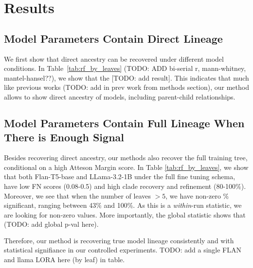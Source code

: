 \documentclass{article}
\theoremstyle{definition}
\theoremstyle{plain}
\begin{document}
\section{Results}
\label{sec:results}


\subsection{Model Parameters Contain Direct Lineage}

We first show that direct ancestry can be recovered under different model conditions. In Table~\ref{tab:rf_by_leaves} (TODO: ADD bi-serial r, mann-whitney, mantel-hansel??), we show that the [TODO: add result].  This indicates that much like previous works (TODO: add in prev work from methods section), our method allows to show direct ancestry of models, including parent-child relationships.

\subsection{Model Parameters Contain Full Lineage When There is Enough Signal}
\label{sec:results:weighttree}
Besides recovering direct ancestry, our methods also recover the full training tree, conditional on a high Atteson Margin score.  In Table \ref{tab:rf_by_leaves}, we show that both Flan-T5-base and LLama-3.2-1B under the full fine tuning schema, have low FN scores (0.08-0.5) and high clade recovery and refinement (80-100\%).  Moreover, we see that when the number of leaves $>5$, we have non-zero \% significant, ranging between 43\% and 100\%. As this is a \textit{within}-run statistic, we are looking for non-zero values.  More importantly, the global statistic shows that (TODO: add global p-val here).

Therefore, our method is recovering true model lineage consistently and with statistical signifiance in our controlled experiments.
TODO: add a single FLAN and llama LORA here (by leaf) in table.
\end{document}
